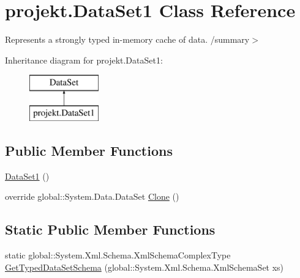 \hypertarget{classprojekt_1_1_data_set1}{}\section{projekt.\+Data\+Set1 Class Reference}
\label{classprojekt_1_1_data_set1}


Represents a strongly typed in-\/memory cache of data. /summary$>$  


Inheritance diagram for projekt.\+Data\+Set1\+:\begin{figure}[H]
\begin{center}
\leavevmode
\includegraphics[height=2.000000cm]{classprojekt_1_1_data_set1}
\end{center}
\end{figure}
\subsection*{Public Member Functions}
\begin{DoxyCompactItemize}
\item 
\mbox{\hyperlink{classprojekt_1_1_data_set1_ac0a73e3256e3bf1ec8de8dc45615b4b4}{Data\+Set1}} ()
\item 
override global\+::\+System.\+Data.\+Data\+Set \mbox{\hyperlink{classprojekt_1_1_data_set1_a26f9dfcb33b30d3fc701574725273fd6}{Clone}} ()
\end{DoxyCompactItemize}
\subsection*{Static Public Member Functions}
\begin{DoxyCompactItemize}
\item 
static global\+::\+System.\+Xml.\+Schema.\+Xml\+Schema\+Complex\+Type \mbox{\hyperlink{classprojekt_1_1_data_set1_af75a036bac30217b6582f66785499005}{Get\+Typed\+Data\+Set\+Schema}} (global\+::\+System.\+Xml.\+Schema.\+Xml\+Schema\+Set xs)
\end{DoxyCompactItemize}
